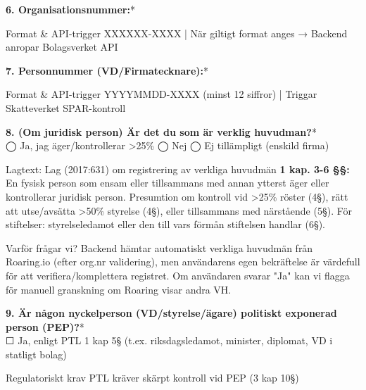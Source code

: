 \documentclass[10pt]{beamer}
\begin{document}
\begin{frame}[label=riskfragor-steg1]
  \vspace{0.2cm}

  \textbf{6. Organisationsnummer:}* \underline{\hspace{4cm}}
  \begin{block}{Format \& API-trigger}
    \tiny XXXXXX-XXXX | När giltigt format anges → Backend anropar Bolagsverket API
  \end{block}

  \vspace{0.2cm}

  \textbf{7. Personnummer (VD/Firmatecknare):}* \underline{\hspace{4cm}}
  \begin{block}{Format \& API-trigger}
    \tiny YYYYMMDD-XXXX (minst 12 siffror) | Triggar Skatteverket SPAR-kontroll
  \end{block}

  \vspace{0.2cm}

  \textbf{8. (Om juridisk person) Är det du som är verklig huvudman?}*\\
  \tiny
  ◯ Ja, jag äger/kontrollerar >25\% \hspace{0.5cm} ◯ Nej \hspace{0.5cm} ◯ Ej tillämpligt (enskild firma)
  \begin{block}{Lagtext: Lag (2017:631) om registrering av verkliga huvudmän}
    \tiny \textbf{1 kap. 3-6 §§:} En fysisk person som ensam eller tillsammans med annan ytterst äger eller kontrollerar juridisk person. Presumtion om kontroll vid >25\% röster (4§), rätt att utse/avsätta >50\% styrelse (4§), eller tillsammans med närstående (5§). För stiftelser: styrelseledamot eller den till vars förmån stiftelsen handlar (6§).
  \end{block}
  \begin{block}{Varför frågar vi?}
    \tiny Backend hämtar automatiskt verkliga huvudmän från Roaring.io (efter org.nr validering), men användarens egen bekräftelse är värdefull för att verifiera/komplettera registret. Om användaren svarar "Ja" kan vi flagga för manuell granskning om Roaring visar andra VH.
  \end{block}

  \vspace{0.2cm}

  \textbf{9. Är någon nyckelperson (VD/styrelse/ägare) politiskt exponerad person (PEP)?}*\\
  \tiny
  ☐ Ja, enligt PTL 1 kap 5§ (t.ex. riksdagsledamot, minister, diplomat, VD i statligt bolag)
  \begin{block}{Regulatoriskt krav}
    \tiny PTL kräver skärpt kontroll vid PEP (3 kap 10§)
  \end{block}

  \vspace{0.4cm}
  \begin{flushright}
    \hyperlink{riskfragor-steg2}{} \hspace{0.3cm} 
  \end{flushright}
\end{frame}
\end{document}
